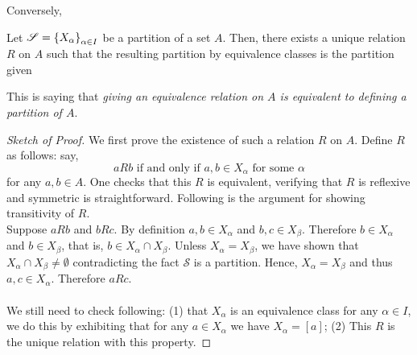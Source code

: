Conversely,
\begin{theorem}
Let $\mathscr{S} = \left\{X_\alpha\right\}_{\alpha \in I}$ be a partition of a set $A$. Then, there exists a unique relation $R$ on $A$ such that the resulting partition by equivalence classes is the partition given
\end{theorem}
This is saying that \emph{giving an equivalence relation on $A$ is equivalent to defining a partition of $A$}.
\begin{proof}[Sketch of Proof]\renewcommand{\qed}{}
We first prove the existence of such a relation $R$ on $A$. Define $R$ as follows: say,
\[aRb \text{ if and only if } a,b \in X_\alpha \text{ for some $\alpha$}\]
for any $a,b \in A$. One checks that this $R$ is equivalent, verifying that $R$ is reflexive and symmetric is straightforward. Following is the argument for showing transitivity of $R$.\\[0.5em]
Suppose $aRb$ and $bRc$. By definition $a,b \in X_\alpha$ and $b,c \in X_\beta$. Therefore $b \in X_\alpha$ and $b \in X_\beta$, that is, $b \in X_\alpha \cap X_\beta$. Unless $X_\alpha = X_\beta$, we have shown that $X_\alpha \cap X_\beta \neq \emptyset$ contradicting the fact $\mathscr{S}$ is a partition. Hence, $X_\alpha = X_\beta$ and thus $a,c \in X_\alpha$. Therefore $aRc$.\\
\\
We still need to check following: (1) that $X_\alpha$ is an equivalence class for any $\alpha \in I$, we do this by exhibiting that for any $a \in X_\alpha$ we have $X_\alpha = [a]$; (2) This $R$ is the unique relation with this property.
\end{proof}

%
%
\vspace*{1em}

